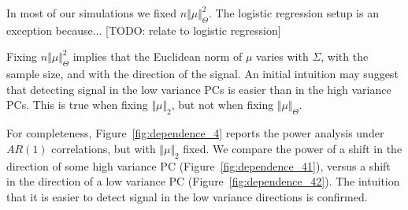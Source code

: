 \documentclass[]{bio}
\begin{document}
In most of our simulations we fixed $n \Vert \mu \Vert_\Theta^2$. 
The logistic regression setup is an exception because... [TODO: relate to logistic regression]

Fixing $n \Vert \mu \Vert_\Theta^2$ implies that the Euclidean norm of $\mu$ varies with $\Sigma$, with the sample size, and with the direction of the signal.
An initial intuition may suggest that detecting signal in the low variance PCs is easier than in the high variance PCs. 
This is true when fixing $\Vert \mu \Vert_2$, but not when fixing $\Vert \mu \Vert_{\Theta}$.

For completeness, Figure~\ref{fig:dependence_4} reports the power analysis under $AR(1)$ correlations, but with $\Vert \mu \Vert_2$ fixed.
We compare the power of a shift in the direction of some high variance PC (Figure~\ref{fig:dependence_41}), versus a shift in the direction of a low variance PC (Figure~\ref{fig:dependence_42}).
The intuition that it is easier to detect signal in the low variance directions is confirmed. 
\end{document}
